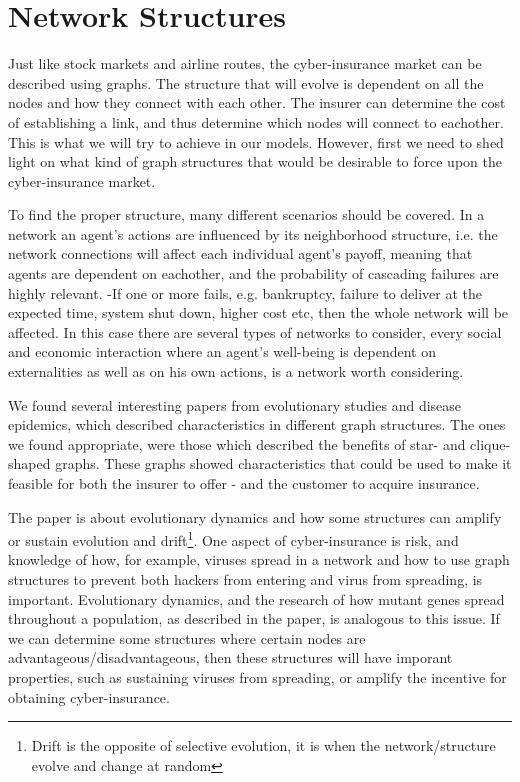 \section{Network Structures}

Just like stock markets and airline routes, the cyber-insurance market can be described using graphs. The structure that will evolve is dependent on all the nodes and how they connect with each other. The insurer can determine the cost of establishing a link, and thus  determine which nodes will connect to eachother. This is what we will try to achieve in our models. However, first we need to shed light on what kind of graph structures that would be desirable to force upon the cyber-insurance market.

To find the proper structure, many different scenarios should be covered. In a network an agent's actions are influenced by its neighborhood structure, i.e. the network connections will affect each individual agent's payoff, meaning that agents are dependent on eachother, and the probability of cascading failures are highly relevant. -If one or more fails, e.g. bankruptcy, failure to deliver at the expected time, system shut down, higher cost etc, then the whole network will be affected. In this case there are several types of networks to consider, every social and economic interaction where an agent's well-being is dependent on externalities as well as on his own actions, is a network worth considering.

We found several interesting papers from evolutionary studies and disease epidemics, which described  characteristics in different graph structures. The ones we found appropriate, were those which described the benefits of star- and clique-shaped graphs. These graphs showed characteristics that could be used to make it feasible for both the insurer to offer - and the customer to acquire insurance. 

 The paper \cite{lieberman2005evolutionary} is about evolutionary dynamics and how some structures
can amplify or sustain evolution and drift\footnote{Drift is the opposite of selective evolution, it is when the network/structure evolve and change at random}. One aspect of cyber-insurance is risk, and knowledge of how, for example, viruses spread in a network and how to use graph structures to prevent both hackers from entering and virus from spreading, is important. Evolutionary dynamics, and the research of how mutant genes spread throughout a population, as described in the paper, is analogous to this issue.
If we can determine some structures where certain nodes are advantageous/disadvantageous, then these structures will have imporant  properties, such as sustaining viruses from spreading, or amplify the incentive for obtaining cyber-insurance. 

